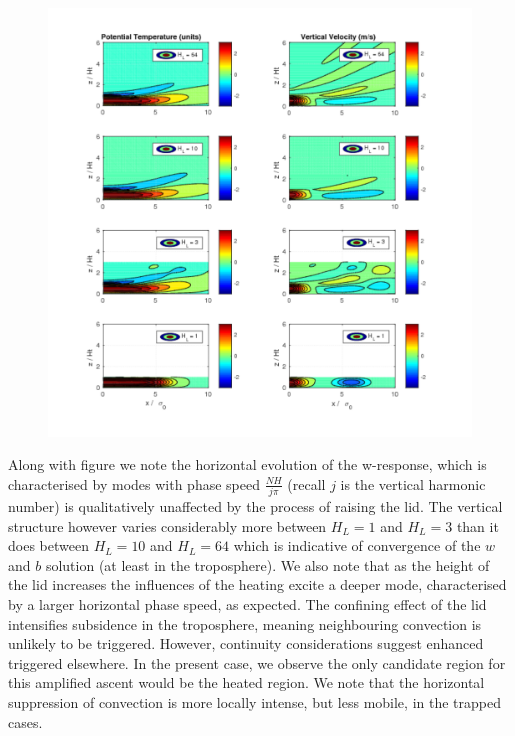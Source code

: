 \documentclass[a4paper,10pt]{article}
\begin{document}
\begin{figure}
  \caption{}
  \centering
    \includegraphics[width=1\textwidth]{raise_lid_t2.pdf}
  \label{raise_lid_t2}
\end{figure}


Along with figure  we note the horizontal evolution of the w-response, which
is characterised by modes with phase speed $\frac{N H}{j \pi}$ (recall $j$ is the vertical
harmonic number) is qualitatively unaffected by the process of raising the lid. The vertical
structure however varies considerably more between $H_L = 1$ and  $H_L = 3$ than it does between
$H_L = 10$ and $H_L = 64$ which is indicative of convergence of the $w$ and $b$ solution (at least
in the troposphere). We also note that as the height of the lid increases the influences of
the heating excite a deeper mode, characterised by a larger horizontal phase speed, as
expected. The confining effect of the lid intensifies subsidence in the troposphere, meaning
neighbouring convection is unlikely to be triggered. However, continuity considerations suggest
enhanced triggered elsewhere. In the present case, we
observe the only candidate region for this amplified ascent would be the heated region. We note that
the horizontal suppression of convection is more locally intense, but less mobile, in the trapped
cases.
\end{document}
